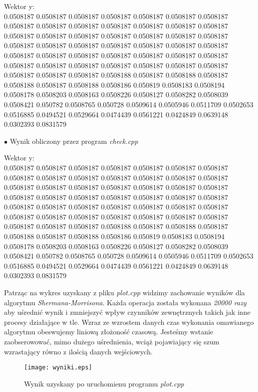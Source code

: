 \documentclass{article}
\begin{document}
    \begin{center}
      \begin{tcolorbox}
        Wektor y:\\
        0.0508187 0.0508187 0.0508187 0.0508187 0.0508187 0.0508187 0.0508187 0.0508187 0.0508187 0.0508187 0.0508187 0.0508187 0.0508187 0.0508187 0.0508187 0.0508187 0.0508187 0.0508187 0.0508187 0.0508187 0.0508187 0.0508187 0.0508187 0.0508187 0.0508187 0.0508187 0.0508187 0.0508187 0.0508187 0.0508187 0.0508187 0.0508187 0.0508187 0.0508187 0.0508187 0.0508187 0.0508187 0.0508187 0.0508187 0.0508187 0.0508187 0.0508187 0.0508187 0.0508187 0.0508187 0.0508188 0.0508187 0.0508188 0.0508187 0.0508188 0.0508187 0.0508188 0.0508186 0.050819 0.0508183 0.0508194 0.0508178 0.0508203 0.0508163 0.0508226 0.0508127 0.0508282 0.0508039 0.0508421 0.050782 0.0508765 0.050728 0.0509614 0.0505946 0.0511709 0.0502653 0.0516885 0.0494521 0.0529664 0.0474439 0.0561221 0.0424849 0.0639148 0.0302393 0.0831579
      \end{tcolorbox}

      \begin{flushleft}
        $\bullet$ Wynik obliczony przez program \textit{check.cpp}
      \end{flushleft}

      \begin{tcolorbox}
        Wektor y:\\
        0.0508187 0.0508187 0.0508187 0.0508187 0.0508187 0.0508187 0.0508187 0.0508187 0.0508187 0.0508187 0.0508187 0.0508187 0.0508187 0.0508187 0.0508187 0.0508187 0.0508187 0.0508187 0.0508187 0.0508187 0.0508187 0.0508187 0.0508187 0.0508187 0.0508187 0.0508187 0.0508187 0.0508187 0.0508187 0.0508187 0.0508187 0.0508187 0.0508187 0.0508187 0.0508187 0.0508187 0.0508187 0.0508187 0.0508187 0.0508187 0.0508187 0.0508187 0.0508187 0.0508187 0.0508187 0.0508188 0.0508187 0.0508188 0.0508187 0.0508188 0.0508187 0.0508188 0.0508186 0.050819 0.0508183 0.0508194 0.0508178 0.0508203 0.0508163 0.0508226 0.0508127 0.0508282 0.0508039 0.0508421 0.050782 0.0508765 0.050728 0.0509614 0.0505946 0.0511709 0.0502653 0.0516885 0.0494521 0.0529664 0.0474439 0.0561221 0.0424849 0.0639148 0.0302393 0.0831579
      \end{tcolorbox}
    \end{center}
    Patrząc na wykres uzyskany z pliku \textit{plot.cpp} widzimy zachowanie wyników dla algorytmu \textit{Shermana-Morrisona}. Każda operacja została wykonana \textit{20000 razy} aby uśrednić wynik i zmniejszyć wpływ czynników zewnętrznych takich jak inne procesy działające w tle. Wzraz ze wzrostem danych czas wykonania omawianego algorytmu obeswujemy liniową złożoność czasową. Jesteśmy wstanie zaobserowować, mimo dużego uśrednienia, wciąż pojawiający się szum wzrastający równo z ilością danych wejściowych.
    \begin{figure}[!ht]
      \centering
      \texttt{[image: wyniki.eps]}
      \caption{Wynik uzyskany po uruchomienu programu \textit{plot.cpp}}
    \end{figure}
    \newpage
\end{document}
